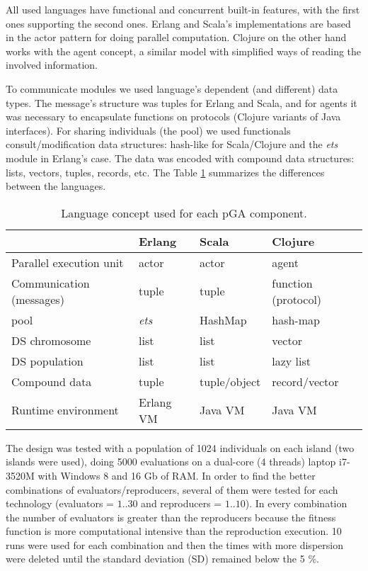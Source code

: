 
All used languages have functional and concurrent built-in features, with the first ones supporting the second ones. Erlang and Scala’s implementations are based in the actor pattern for doing parallel computation. Clojure on the other hand works with the agent concept, a similar model with simplified ways of reading the involved information.

To communicate modules we used language’s dependent (and different) data types.
The message's structure was tuples for Erlang and Scala, and for agents it was necessary to encapsulate functions on protocols (Clojure variants of Java interfaces). For sharing individuals (the pool) we used functionals consult/modification data structures: hash-like for Scala/Clojure and the {\em ets} module in Erlang’s case. The data was encoded with compound data structures: lists, vectors, tuples, records, etc. The Table \ref{tb:res:comp} summarizes the differences between the languages.

\begin{table}
  \caption{Language concept used for each pGA component.}\label{tb:res:comp}
  \centering
  \begin{tabular}{|p{2.2cm}|>{\centering}p{1.6cm}|>{\centering}p{1.6cm}|>{\centering}p{1.8cm}|}
    \hline
     & \textbf{Erlang} & \textbf{Scala} & \textbf{Clojure} \tabularnewline
    \hline
    Parallel execution unit & actor & actor & agent \tabularnewline
    \hline
    Communication (messages) & tuple & tuple & function (protocol) \tabularnewline
    \hline
    pool & \emph{ets} & HashMap & hash-map \tabularnewline
    \hline
    DS chromosome & list & list & vector \tabularnewline
    \hline
    DS population & list & list & lazy list \tabularnewline
    \hline
    Compound data & tuple & tuple/object & record/vector \tabularnewline
    \hline
    Runtime environment & Erlang VM & Java VM & Java VM \tabularnewline
    \hline
  \end{tabular}

\end{table}



The design was tested with a population of 1024 individuals on each island (two islands were used), doing 5000 evaluations on a dual-core (4 threads) laptop  i7-3520M with Windows 8 and 16 Gb of RAM. In order to find the better combinations of evaluators/reproducers, several of them were tested for each technology (evaluators = $1..30$ and reproducers = $1..10$). In every combination the number of evaluators is greater than the reproducers because the fitness function is more computational intensive than the reproduction execution. 10 runs were used for each combination and then the times with more dispersion were deleted until the standard deviation (SD) remained below the 5 \%.

